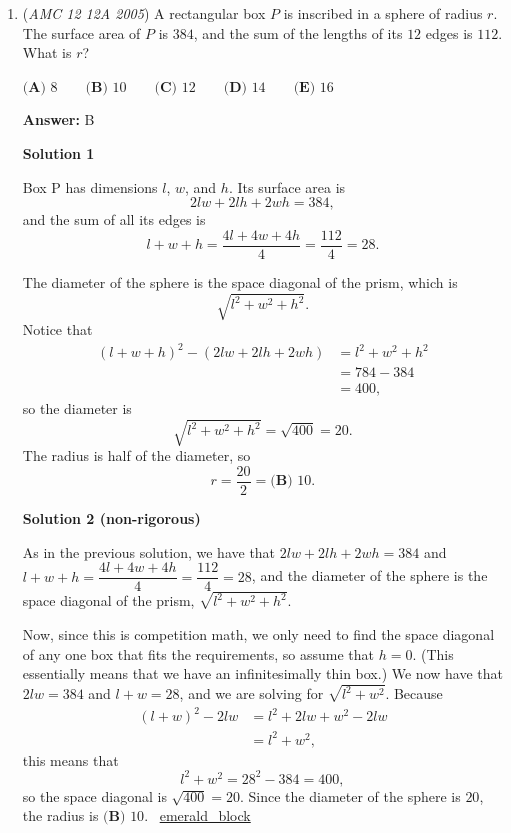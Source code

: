 \begin{enumerate}
	\item (\textit{AMC 12 12A 2005}) A rectangular box $P$ is inscribed in a sphere of radius $r$. The surface area of $P$ is $384$, and the sum of the lengths of its $12$ edges is $112$. What is $r$?


 $\textbf{(A) } 8 \qquad \textbf{(B) } 10 \qquad \textbf{(C) } 12 \qquad \textbf{(D) } 14 \qquad \textbf{(E) } 16$

 \textbf{Answer: }B



\textbf{Solution 1}

Box P has dimensions $l$, $w$, and $h$. Its surface area is 
 \[2lw+2lh+2wh=384,\] and the sum of all its edges is 
 \[l + w + h = \dfrac{4l+4w+4h}{4} = \dfrac{112}{4} = 28.\]

 The diameter of the sphere is the space diagonal of the prism, which is 
 \[\sqrt{l^2 + w^2 +h^2}.\]Notice that 
 \begin{align*}(l + w + h)^2 - (2lw + 2lh + 2wh) &= l^2 + w^2 + h^2 \\ &= 784 - 384 \\ &= 400,\end{align*}
 so the diameter is
 \[\sqrt{l^2 + w^2 +h^2} = \sqrt{400} = 20.\] The radius is half of the diameter, so
 \[r=\frac{20}{2} = \boxed{\textbf{(B) } 10}.\]




\textbf{Solution 2 (non-rigorous)}

As in the previous solution, we have that $2lw+2lh+2wh=384$ and $l + w + h = \dfrac{4l+4w+4h}{4} = \dfrac{112}{4} = 28$, and the diameter of the sphere is the space diagonal of the prism, $\sqrt{l^2 + w^2 + h^2}$.

 Now, since this is competition math, we only need to find the space diagonal of any one box that fits the requirements, so assume that $h=0$. (This essentially means that we have an infinitesimally thin box.) We now have that $2lw = 384$ and $l + w = 28$, and we are solving for $\sqrt{l^2 + w^2}$. Because 
 \begin{align*}(l + w)^2 - 2lw &= l^2 + 2lw + w^2 - 2lw \\ &= l^2 + w^2,\end{align*}
 this means that 
 \[l^2 + w^2 = 28^2 - 384 = 400,\] so the space diagonal is $\sqrt{400} = 20$. Since the diameter of the sphere is $20$, the radius is $\boxed{\textbf{(B) } 10}$. ~\href{https://artofproblemsolving.com/wiki/index.php?title=User:Emerald\_block}{emerald\_block}

 



\end{enumerate}
